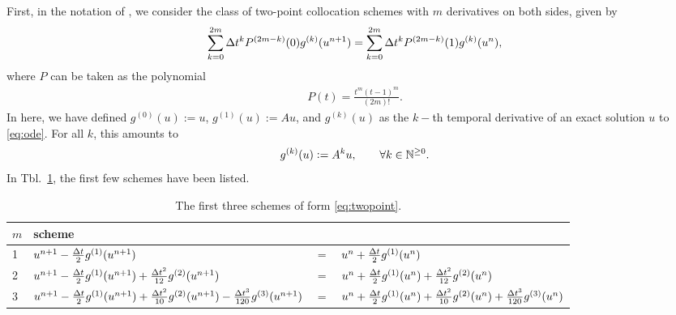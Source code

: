 \documentclass[]{scrartcl}
\numberwithin{equation}{section}
\begin{document}
First, in the notation of \cite{ranocha2023multiderivative}, we consider the class of two-point collocation schemes with $m$ derivatives on both sides, given by \cite[II.13]{hairer2008solving}
%
\begin{align}
 \label{eq:twopoint}
 \sum_{k=0}^{2m} \Delta t^k P^{(2m-k)}(0) g^{(k)}(u^{n+1})  = \sum_{k=0}^{2m} \Delta t^k P^{(2m-k)}(1) g^{(k)}(u^{n}),
\end{align}
%
where $P$ can be taken as the polynomial
%
\begin{align*}
 P(t) = \frac{t^m(t-1)^m}{(2m)!}.
\end{align*}
%
In here, we have defined $g^{(0)}(u):=u$, $g^{(1)}(u):= Au$, and $g^{(k)}(u)$ as the $k-$th temporal derivative of an exact solution $u$ to \eqref{eq:ode}. For all $k$, this amounts to
%
\begin{align}
 \label{eq:temporalderivatives}
 g^{(k)}(u) := A^k u, \qquad \forall k \in \mathbb{N}^{\geq 0}.
\end{align}
%
In Tbl.~\ref{tbl:twopoint}, the first few schemes have been listed.
\begin{table}
\begin{tabular}{l|lcl}
 $m$ & scheme \\ \hline
 1 & $u^{n+1}-\frac {\Delta t} 2 g^{(1)}(u^{n+1}) $&$=$&$ u^{n}+\frac {\Delta t} 2 g^{(1)}(u^{n})$ \\
 2 & $u^{n+1}-\frac {\Delta t} 2 g^{(1)}(u^{n+1}) + \frac {\Delta t^2}{12} g^{(2)}(u^{n+1}) $&$=$&$ u^{n}+\frac {\Delta t} 2 g^{(1)}(u^{n}) + \frac {\Delta t^2}{12} g^{(2)}(u^{n})$ \\
 3 & $u^{n+1}-\frac {\Delta t} 2 g^{(1)}(u^{n+1}) + \frac {\Delta t^2}{10} g^{(2)}(u^{n+1}) - \frac {\Delta t^3}{120} g^{(3)}(u^{n+1}) $&$=$&$ u^{n}+\frac {\Delta t} 2 g^{(1)}(u^{n}) + \frac {\Delta t^2}{10} g^{(2)}(u^{n}) + \frac {\Delta t^3}{120} g^{(3)}(u^{n})$
\end{tabular}
\caption{The first three schemes of form \eqref{eq:twopoint}.}\label{tbl:twopoint}
\end{table}
\end{document}
